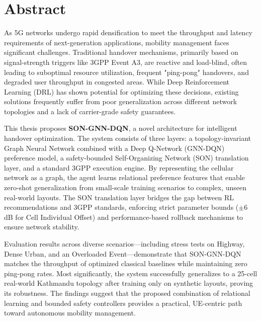 \documentclass[12pt,a4paper,oneside]{report}
\begin{document}
\chapter*{Abstract}
As 5G networks undergo rapid densification to meet the throughput and latency requirements of next-generation applications, mobility management faces significant challenges. Traditional handover mechanisms, primarily based on signal-strength triggers like 3GPP Event A3, are reactive and load-blind, often leading to suboptimal resource utilization, frequent "ping-pong" handovers, and degraded user throughput in congested areas. While Deep Reinforcement Learning (DRL) has shown potential for optimizing these decisions, existing solutions frequently suffer from poor generalization across different network topologies and a lack of carrier-grade safety guarantees.

This thesis proposes \textbf{SON-GNN-DQN}, a novel architecture for intelligent handover optimization. The system consists of three layers: a topology-invariant Graph Neural Network combined with a Deep Q-Network (GNN-DQN) preference model, a safety-bounded Self-Organizing Network (SON) translation layer, and a standard 3GPP execution engine. By representing the cellular network as a graph, the agent learns relational preference features that enable zero-shot generalization from small-scale training scenarios to complex, unseen real-world layouts. The SON translation layer bridges the gap between RL recommendations and 3GPP standards, enforcing strict parameter bounds ($\pm 6$ dB for Cell Individual Offset) and performance-based rollback mechanisms to ensure network stability. 

Evaluation results across diverse scenarios—including stress tests on Highway, Dense Urban, and an Overloaded Event—demonstrate that SON-GNN-DQN matches the throughput of optimized classical baselines while maintaining zero ping-pong rates. Most significantly, the system successfully generalizes to a 25-cell real-world Kathmandu topology after training only on synthetic layouts, proving its robustness. The findings suggest that the proposed combination of relational learning and bounded safety controllers provides a practical, UE-centric path toward autonomous mobility management.

\tableofcontents
\listoffigures
\listoftables

\clearpage
{}
\end{document}
